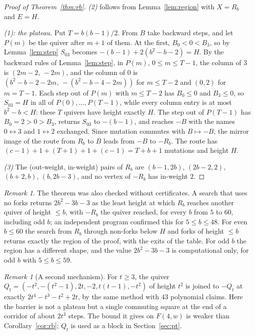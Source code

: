 \documentclass[11pt]{amsart}
\theoremstyle{definition}
\theoremstyle{remark}
\newtheorem{remark}[theorem]{Remark}
\begin{document}
\begin{proof}[Proof of Theorem~\ref{thm:rb}]
\emph{(2)} follows from Lemma~\ref{lem:region} with $X=R_b$ and $E=H$.

\emph{(1): the plateau.} Put $T=b(b-1)/2$. From $B$ take backward steps, and let $P(m)$ be the quiver after $m+1$ of them. At the first, $B_0<0<B_3$, so by Lemma~\ref{lem:step} $S_{03}$ becomes $-(b-1)+2(b^2-b-2)=H$. By the backward rules of Lemma~\ref{lem:step}, in $P(m)$, $0\le m\le T-1$, the column of $3$ is $(2m-2,\,-2m)$, and the column of $0$ is $(b^2-b-2-2m,\,-(b^2-b-4-2m))$ for $m\le T-2$ and $(0,2)$ for $m=T-1$. Each step out of $P(m)$ with $m\le T-2$ has $B_0\le0$ and $B_3\le0$, so $S_{03}=H$ in all of $P(0),\dots,P(T-1)$, while every column entry is at most $b^2-b<H$: these $T$ quivers have height exactly $H$. The step out of $P(T-1)$ has $B_0=2>0>B_3$, returns $S_{03}$ to $-(b-1)$, and reaches $-B$ with the names $0\leftrightarrow3$ and $1\leftrightarrow2$ exchanged. Since mutation commutes with $B\mapsto-B$, the mirror image of the route from $R_b$ to $B$ leads from $-B$ to $-R_b$. The route has $(c-1)+1+(T+1)+1+(c-1)=T+b+1$ mutations and height $H$.

\emph{(3)} The (out-weight, in-weight) pairs of $R_b$ are $(b-1,2b)$, $(2b-2,2)$, $(b+2,b)$, $(b,2b-3)$, and no vertex of $-R_b$ has in-weight $2$.
\end{proof}

\begin{remark}\label{rem:rbchecks}
The theorem was also checked without certificates. A search that uses no forks returns $2b^2-3b-3$ as the least height at which $R_b$ reaches another quiver of height $\le b$, with $-R_b$ the quiver reached, for every $b$ from $5$ to $60$, including odd $b$; an independent program confirmed this for $5\le b\le48$. For even $b\le60$ the search from $R_b$ through non-forks below $H$ and forks of height $\le b$ returns exactly the region of the proof, with the exits of the table. For odd $b$ the region has a different shape, and the value $2b^2-3b-3$ is computational only, for odd $b$ with $5\le b\le59$.
\end{remark}

\begin{remark}[A second mechanism]\label{rem:qt}
For $t\ge3$, the quiver $Q_t=(-t^2,-(t^2-1),2t,-2,t(t-1),-t^2)$ of height $t^2$ is joined to $-Q_t$ at exactly $2t^4-t^3-t^2+2t$, by the same method with $43$ polynomial claims. Here the barrier is not a plateau but a single commuting square at the end of a corridor of about $2t^3$ steps. The bound it gives on $F(4,w)$ is weaker than Corollary~\ref{cor:rb}; $Q_t$ is used as a block in Section~\ref{sec:pt}.
\end{remark}
\end{document}
